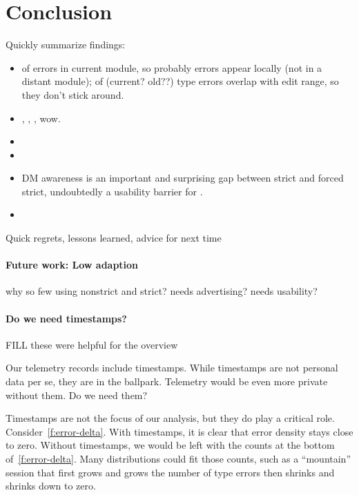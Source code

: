 \documentclass[english,submission,cleveref]{programming}
\begin{document}
\section{Conclusion}
\label{s:conclusion}

Quickly summarize findings:

\begin{itemize}
  \item
     of errors in current module, so probably errors appear locally (not in a distant module);
     of (current? old??) type errors overlap with edit range, so they don't stick around.
  \item
     \mnocheck{},   \mnonstrict{},   \mstrict{}, wow.
  \item
  \item
  \item
    DM awareness is an important and surprising gap between strict
    and forced strict, undoubtedly a usability barrier for \mstrict{}.
  \item
\end{itemize}

Quick regrets, lessons learned, advice for next time

\paragraph{Future work: Low adaption}

why so few using nonstrict and strict?
needs advertising?
needs usability?


\paragraph{Do we need timestamps?}

FILL these were helpful for the overview

Our telemetry records include timestamps.
While timestamps are not personal data per se, they are in the ballpark.
Telemetry would be even more private without them.
Do we need them?

Timestamps are not the focus of our analysis, but they do play a critical role.
Consider~\cref{f:error-delta}.
With timestamps, it is clear that error density stays close to zero.
Without timestamps, we would be left with the counts at the bottom
of~\cref{f:error-delta}.
Many distributions could fit those counts, such as a ``mountain'' session that first
grows and grows the number of type errors then shrinks and shrinks down to zero.
\end{document}
